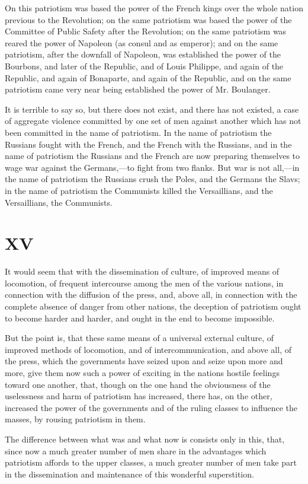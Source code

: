 \documentclass{book}
\begin{document}
On this patriotism was based the power of the French kings over the whole nation previous to the Revolution; on the same patriotism was based the power of the Committee of Public Safety after the Revolution; on the same patriotism was reared the power of Napoleon (as consul and as emperor); and on the same patriotism, after the downfall of Napoleon, was established the power of the Bourbons, and later of the Republic, and of Louis Philippe, and again of the Republic, and again of Bonaparte, and again of the Republic, and on the same patriotism came very near being established the power of Mr. Boulanger.

It is terrible to say so, but there does not exist, and there has not existed, a case of aggregate violence committed by one set of men against another which has not been committed in the name of patriotism. In the name of patriotism the Russians fought with the French, and the French with the Russians, and in the name of patriotism the Russians and the French are now preparing themselves to wage war against the Germans,—to fight from two flanks. But war is not all,—in the name of patriotism the Russians crush the Poles, and the Germans the Slavs; in the name of patriotism the Communists killed the Versaillians, and the Versaillians, the Communists.

\chapter{XV}
\label{chapter-15}
It would seem that with the dissemination of culture, of improved means of locomotion, of frequent intercourse among the men of the various nations, in connection with the diffusion of the press, and, above all, in connection with the complete absence of danger from other nations, the deception of patriotism ought to become harder and harder, and ought in the end to become impossible.

But the point is, that these same means of a universal external culture, of improved methods of locomotion, and of intercommunication, and above all, of the press, which the governments have seized upon and seize upon more and more, give them now such a power of exciting in the nations hostile feelings toward one another, that, though on the one hand the obviousness of the uselessness and harm of patriotism has increased, there has, on the other, increased the power of the governments and of the ruling classes to influence the masses, by rousing patriotism in them.

The difference between what was and what now is consists only in this, that, since now a much greater number of men share in the advantages which patriotism affords to the upper classes, a much greater number of men take part in the dissemination and maintenance of this wonderful superstition.
\end{document}
